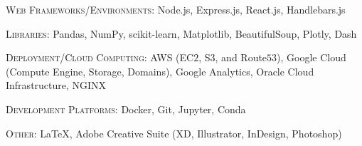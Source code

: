 \documentclass[hidelinks, 10pt]{article}
\begin{document}
{\begin{minipage}[ct]{0.9\linewidth}
\vspace{1.5mm}

\textsc{Web Frameworks/Environments: } Node.js, Express.js, React.js, Handlebars.js

\vspace{1.5mm}

\textsc{Libraries: } Pandas, NumPy, scikit-learn, Matplotlib, BeautifulSoup,
Plotly, Dash

\vspace{1.5mm}

\textsc{Deployment/Cloud Computing:} AWS (EC$2$, S$3$, and Route$53$),
Google Cloud (Compute Engine, Storage, Domains), Google Analytics, Oracle Cloud
Infrastructure, NGINX

\vspace{1.5mm}

\textsc{Development Platforms: } Docker, Git, Jupyter, Conda



\vspace{1.5mm}

\textsc{Other: } \LaTeX, Adobe Creative Suite (XD, Illustrator, InDesign, Photoshop)
\end{minipage}

}
\end{document}

